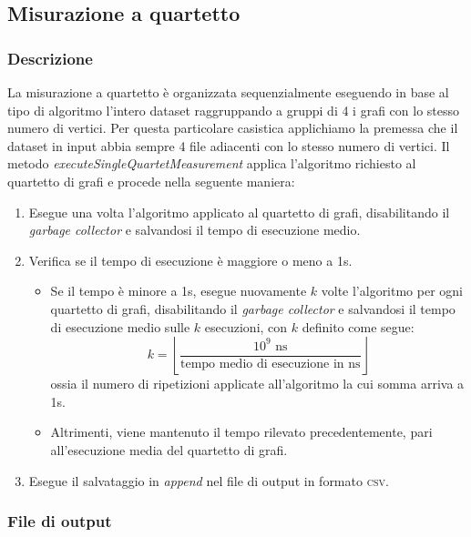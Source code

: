 \subsection{Misurazione a quartetto}

\subsubsection{Descrizione} 

La misurazione a quartetto è organizzata sequenzialmente eseguendo in base al tipo di algoritmo l'intero dataset raggruppando a gruppi di 4 i grafi con lo stesso numero di vertici. Per questa particolare casistica applichiamo la premessa che il dataset in input abbia sempre 4 file adiacenti con lo stesso numero di vertici. Il metodo \textit{executeSingleQuartetMeasurement} applica l'algoritmo richiesto al quartetto di grafi e procede nella seguente maniera:

\begin{enumerate}
    \item Esegue una volta l'algoritmo applicato al quartetto di grafi, disabilitando il \textit{garbage collector} e salvandosi il tempo di esecuzione medio.
    \item Verifica se il tempo di esecuzione è maggiore o meno a 1s.
    \begin{itemize}
        \item Se il tempo è minore a 1s, esegue nuovamente \(k\) volte l'algoritmo per ogni quartetto di grafi, disabilitando il \textit{garbage collector} e salvandosi il tempo di esecuzione medio sulle \(k\) esecuzioni, con \(k\) definito come segue:  \[ k = \left\lfloor\frac{10^9 \textrm{ ns}}{\textrm{tempo medio di esecuzione in ns}}\right\rfloor\]
        ossia il numero di ripetizioni applicate all'algoritmo la cui somma arriva a 1s.
        \item Altrimenti, viene mantenuto il tempo rilevato precedentemente, pari all'esecuzione media del quartetto di grafi.
    \end{itemize}
    \item Esegue il salvataggio in \textit{append} nel file di output in formato \textsc{csv}.
\end{enumerate}


\subsubsection{File di output}

